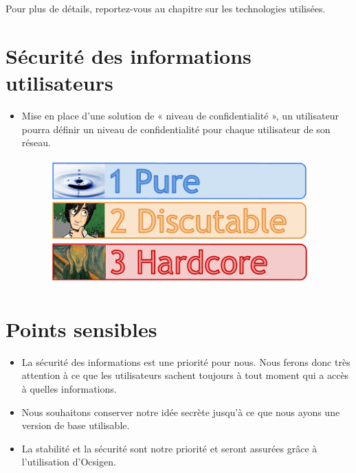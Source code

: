 \documentclass{life-fr}
\begin{document}
Pour plus de détails, reportez-vous au chapitre sur les technologies utilisées.

\section{Sécurité des informations utilisateurs}

\begin{itemize}
  \item Mise en place d’une solution de « niveau de confidentialité », un utilisateur pourra définir un niveau de confidentialité pour chaque utilisateur de son réseau.

\begin{figure}[H]
  \begin{center}
    \includegraphics[width=10cm]{img/confidentialite.png}
  \end{center}
\end{figure}

\end{itemize}

\section{Points sensibles}

\begin{itemize}
  \item La sécurité des informations est une priorité pour nous. Nous ferons donc très attention à ce que les utilisateurs sachent toujours à tout moment qui a accès à quelles informations.
  \item Nous souhaitons conserver notre idée secrète jusqu’à ce que nous ayons une version de base utilisable.
  \item La stabilité et la sécurité sont notre priorité et seront assurées grâce à l'utilisation d'Ocsigen.
\end{itemize}

\end{document}
